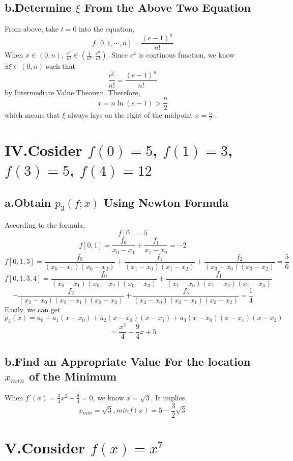 \documentclass[twoside,a4paper,12pt]{article}
\begin{document}
\subsection*{b.Determine $\xi$ From the Above Two Equation}
From above, take $t=0$ into the equation,
\[
f[0,1,\cdots,n]=\frac{(e-1)^n}{n!}
\]
When $x \in (0,n)$, $\frac{e^x}{n!} \in (\frac{1}{n!},\frac{e^n}{n!})$. Since $e^x$ is continous function, we know $\exists \xi \in (0,n)$ such that 
\[
\frac{e^{\xi}}{n!}= \frac{(e-1)^n}{n!}
\]
by Intermediate Value Theorem. Therefore,
\[
x=n \ln{(e-1)} > \frac{n}{2}
\]
which means that $\xi$ always lays on the right of the midpoint $x=\frac{n}{2}$ .
\section*{IV.Cosider $f(0)=5$, $f(1)=3$, $f(3)=5$, $f(4)=12$}
\subsection*{a.Obtain $p_3(f;x)$ Using Newton Formula}
According to the formula,
\[
f[0]=5
\]
\[
f[0,1]=\frac{f_0}{x_0-x_1}+\frac{f_1}{x_1-x_0}=-2
\]
\[
f[0,1,3]=\frac{f_0}{(x_0-x_1)(x_0-x_2)}+\frac{f_1}{(x_1-x_0)(x_1-x_2)}+\frac{f_2}{(x_3-x_0)(x_3-x_2)}=\frac{5}{6}
\]
\[
f[0,1,3,4]=\frac{f_0}{(x_0-x_1)(x_0-x_2)(x_0-x_3)}+\frac{f_1}{(x_1-x_0)(x_1-x_2)(x_1-x_3)}
\]
\[
+\frac{f_2}{(x_2-x_0)(x_2-x_1)(x_2-x_3)}+\frac{f_3}{(x_3-x_0)(x_3-x_1)(x_3-x_2)}=\frac{1}{4}
\]
Easily, we can get
\[
p_3(x)=a_0+a_1(x-x_0)+a_2(x-x_0)(x-x_1)+a_3(x-x_0)(x-x_1)(x-x_2)
\]
\[
=\frac{x^3}{4}-\frac{9}{4}x+5
\]
\subsection*{b.Find an Appropriate Value For the location $x_{min}$ of the Minimum}
When $f'(x)=\frac{3}{4}x^2-\frac{9}{4}=0$, we know $x=\sqrt{3}$. It implies 
\[
x_{min}=\sqrt{3} ,minf(x)=5-\frac{3}{2}\sqrt{3}
\]
\section*{V.Consider $f(x)=x^{7}$}
\end{document}
